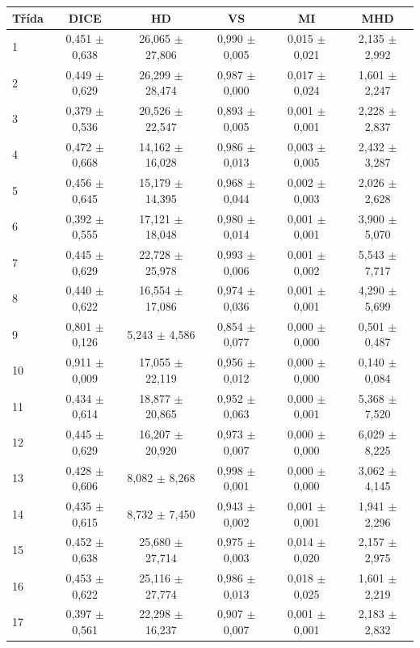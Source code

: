 \begin{tabular}{l c c c c c}
 \hline
Třída & DICE & HD & VS & MI & MHD \\ \hline
1 & 0,451 $\pm$ 0,638 & 26,065 $\pm$ 27,806 & 0,990 $\pm$ 0,005 & 0,015 $\pm$ 0,021 & 2,135 $\pm$ 2,992 \\
2 & 0,449 $\pm$ 0,629 & 26,299 $\pm$ 28,474 & 0,987 $\pm$ 0,000 & 0,017 $\pm$ 0,024 & 1,601 $\pm$ 2,247 \\
3 & 0,379 $\pm$ 0,536 & 20,526 $\pm$ 22,547 & 0,893 $\pm$ 0,005 & 0,001 $\pm$ 0,001 & 2,228 $\pm$ 2,837 \\
4 & 0,472 $\pm$ 0,668 & 14,162 $\pm$ 16,028 & 0,986 $\pm$ 0,013 & 0,003 $\pm$ 0,005 & 2,432 $\pm$ 3,287 \\
5 & 0,456 $\pm$ 0,645 & 15,179 $\pm$ 14,395 & 0,968 $\pm$ 0,044 & 0,002 $\pm$ 0,003 & 2,026 $\pm$ 2,628 \\
6 & 0,392 $\pm$ 0,555 & 17,121 $\pm$ 18,048 & 0,980 $\pm$ 0,014 & 0,001 $\pm$ 0,001 & 3,900 $\pm$ 5,070 \\
7 & 0,445 $\pm$ 0,629 & 22,728 $\pm$ 25,978 & 0,993 $\pm$ 0,006 & 0,001 $\pm$ 0,002 & 5,543 $\pm$ 7,717 \\
8 & 0,440 $\pm$ 0,622 & 16,554 $\pm$ 17,086 & 0,974 $\pm$ 0,036 & 0,001 $\pm$ 0,001 & 4,290 $\pm$ 5,699 \\
9 & 0,801 $\pm$ 0,126 & 5,243 $\pm$ 4,586 & 0,854 $\pm$ 0,077 & 0,000 $\pm$ 0,000 & 0,501 $\pm$ 0,487 \\
10 & 0,911 $\pm$ 0,009 & 17,055 $\pm$ 22,119 & 0,956 $\pm$ 0,012 & 0,000 $\pm$ 0,000 & 0,140 $\pm$ 0,084 \\
11 & 0,434 $\pm$ 0,614 & 18,877 $\pm$ 20,865 & 0,952 $\pm$ 0,063 & 0,000 $\pm$ 0,001 & 5,368 $\pm$ 7,520 \\
12 & 0,445 $\pm$ 0,629 & 16,207 $\pm$ 20,920 & 0,973 $\pm$ 0,007 & 0,000 $\pm$ 0,000 & 6,029 $\pm$ 8,225 \\
13 & 0,428 $\pm$ 0,606 & 8,082 $\pm$ 8,268 & 0,998 $\pm$ 0,001 & 0,000 $\pm$ 0,000 & 3,062 $\pm$ 4,145 \\
14 & 0,435 $\pm$ 0,615 & 8,732 $\pm$ 7,450 & 0,943 $\pm$ 0,002 & 0,001 $\pm$ 0,001 & 1,941 $\pm$ 2,296 \\
15 & 0,452 $\pm$ 0,638 & 25,680 $\pm$ 27,714 & 0,975 $\pm$ 0,003 & 0,014 $\pm$ 0,020 & 2,157 $\pm$ 2,975 \\
16 & 0,453 $\pm$ 0,622 & 25,116 $\pm$ 27,774 & 0,986 $\pm$ 0,013 & 0,018 $\pm$ 0,025 & 1,601 $\pm$ 2,219 \\
17 & 0,397 $\pm$ 0,561 & 22,298 $\pm$ 16,237 & 0,907 $\pm$ 0,007 & 0,001 $\pm$ 0,001 & 2,183 $\pm$ 2,832 \\

\end{tabular}
